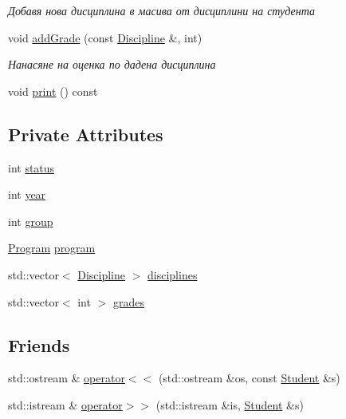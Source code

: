 \begin{DoxyCompactItemize}
\begin{DoxyCompactList}\small\item\em Добавя нова дисциплина в масива от дисциплини на студента \end{DoxyCompactList}\item 
void \hyperlink{class_student_ab5a5f93a5d48e7904413de356eb89811}{add\+Grade} (const \hyperlink{class_discipline}{Discipline} \&, int)
\begin{DoxyCompactList}\small\item\em Нанасяне на оценка по дадена дисциплина \end{DoxyCompactList}\item 
void \hyperlink{class_student_abdbb14cd83ef23c09f811bd1e30ddd4f}{print} () const
\end{DoxyCompactItemize}
\subsection*{Private Attributes}
\begin{DoxyCompactItemize}
\item 
int \hyperlink{class_student_a3f6f0d1198b3ffb8749b2f8e2b5a18c1}{status}
\item 
int \hyperlink{class_student_aca42f18eeeadf5428cf30a3078a97389}{year}
\item 
int \hyperlink{class_student_aec0553c2fba76a0c74375af5c24f92da}{group}
\item 
\hyperlink{class_program}{Program} \hyperlink{class_student_af35065a90ecfc87727eb1167f62688f5}{program}
\item 
std\+::vector$<$ \hyperlink{class_discipline}{Discipline} $>$ \hyperlink{class_student_a5fd8877a3768663196207a89c65f2e13}{disciplines}
\item 
std\+::vector$<$ int $>$ \hyperlink{class_student_af7d0bacc326744ef438109be5feaf20c}{grades}
\end{DoxyCompactItemize}
\subsection*{Friends}
\begin{DoxyCompactItemize}
\item 
std\+::ostream \& \hyperlink{class_student_a2f6afd7f32282f31d42e9ccf4340983d}{operator$<$$<$} (std\+::ostream \&os, const \hyperlink{class_student}{Student} \&s)
\item 
std\+::istream \& \hyperlink{class_student_af7032f120efacd17a8c617ed189f1294}{operator$>$$>$} (std\+::istream \&is, \hyperlink{class_student}{Student} \&s)
\end{DoxyCompactItemize}


